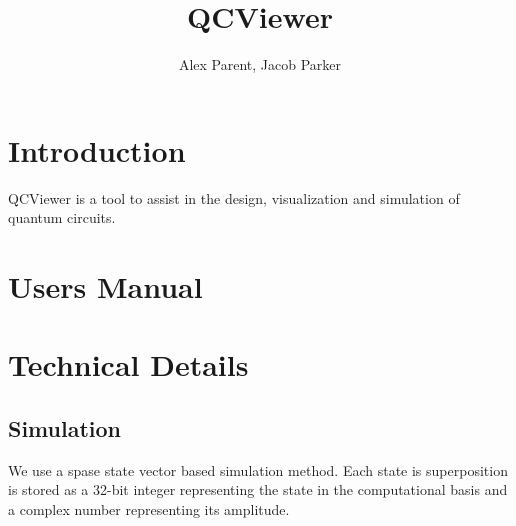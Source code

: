 \documentclass{article}
\begin{document}
\title{QCViewer}
\author{Alex Parent, Jacob Parker}
\maketitle

\section{Introduction}
QCViewer is a tool to assist in the design, visualization and simulation of quantum circuits.

\section{Users Manual}

\section{Technical Details}
\subsection{Simulation}
We use a spase state vector based simulation method.  Each state is superposition is stored as a 32-bit integer representing the state in the computational basis
and a complex number representing its amplitude.
%
%
\end{document}
